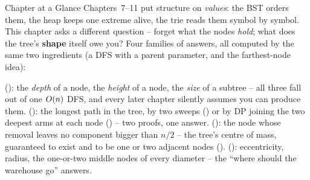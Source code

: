 
\begin{chaptertheorybox}{Chapter at a Glance}
Chapters~7--11 put structure on \emph{values}: the BST orders them, the heap
keeps one extreme alive, the trie reads them symbol by symbol. This chapter asks a
different question -- forget what the nodes \emph{hold}; what does the tree's
\textbf{shape} itself owe you? Four families of answers, all computed by the same
two ingredients (a DFS with a parent parameter, and the farthest-node idea):

 (): the \emph{depth} of a node, the
\emph{height} of a node, the \emph{size} of a subtree -- all three fall out of one
$O(n)$ DFS, and every later chapter silently assumes you can produce them.
 (): the longest path in the tree, by two
sweeps () or by DP joining the two deepest arms at each node
() -- two proofs, one answer.
 (): the node whose removal leaves no component
bigger than $n/2$ -- the tree's centre of mass, guaranteed to exist and to be one
or two adjacent nodes ().
 (): eccentricity, radius, the one-or-two
middle nodes of every diameter -- the ``where should the warehouse go'' answers.


\end{chaptertheorybox}
